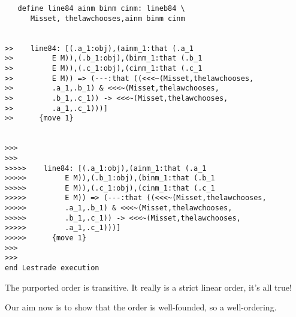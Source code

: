 \documentclass[12pt]{article}
\begin{document}
\begin{verbatim}
   define line84 ainm binm cinm: lineb84 \
      Misset, thelawchooses,ainm binm cinm


>>    line84: [(.a_1:obj),(ainm_1:that (.a_1
>>         E M)),(.b_1:obj),(binm_1:that (.b_1
>>         E M)),(.c_1:obj),(cinm_1:that (.c_1
>>         E M)) => (---:that ((<<<~(Misset,thelawchooses,
>>         .a_1,.b_1) & <<<~(Misset,thelawchooses,
>>         .b_1,.c_1)) -> <<<~(Misset,thelawchooses,
>>         .a_1,.c_1)))]
>>      {move 1}


>>>
>>>
>>>>>    line84: [(.a_1:obj),(ainm_1:that (.a_1
>>>>>         E M)),(.b_1:obj),(binm_1:that (.b_1
>>>>>         E M)),(.c_1:obj),(cinm_1:that (.c_1
>>>>>         E M)) => (---:that ((<<<~(Misset,thelawchooses,
>>>>>         .a_1,.b_1) & <<<~(Misset,thelawchooses,
>>>>>         .b_1,.c_1)) -> <<<~(Misset,thelawchooses,
>>>>>         .a_1,.c_1)))]
>>>>>      {move 1}
>>>
>>>
end Lestrade execution
\end{verbatim}

The purported order is transitive.  It really is a strict linear order, it's all true!

Our aim now is to show that the order is well-founded, so a well-ordering.
\end{document}
